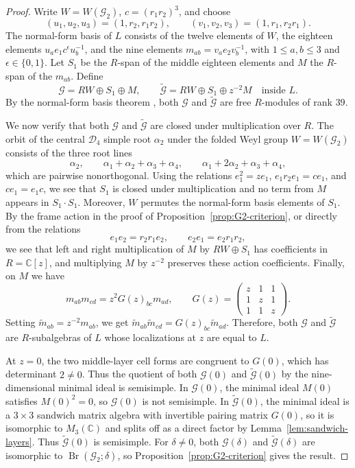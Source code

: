 \documentclass[11pt,a4paper]{amsart}
\theoremstyle{uprightdefinition}
\theoremstyle{remark}\newtheorem{remark}[theorem]{Remark}
\begin{document}
\begin{proof}
Write $W=W(\mathscr{G}_2)$, $c=(r_1r_2)^3$, and choose
\[
 (u_1,u_2,u_3)=(1,r_2,r_1r_2),\qquad
 (v_1,v_2,v_3)=(1,r_1,r_2r_1).
\]
The normal-form basis of $L$ consists of the twelve elements of $W$,
the eighteen elements
$u_a e_1c^\epsilon u_b^{-1}$, and the nine elements
$m_{ab}=v_a e_2v_b^{-1}$, with $1\le a,b\le3$ and
$\epsilon\in\{0,1\}$. Let $S_1$ be the $R$-span of the middle
eighteen elements and $M$ the $R$-span of the $m_{ab}$. Define
\[
 \mathcal G=RW\oplus S_1\oplus M,\qquad
 \widetilde{\mathcal G}=RW\oplus S_1\oplus z^{-2}M
 \quad\text{inside }L.
\]
By the normal-form basis theorem \cite[Theorem~6.1]{LiuG22015}, both $\mathcal G$ and $\widetilde{\mathcal G}$ are free $R$-modules of rank $39$.

We now verify that both $\mathcal G$ and $\widetilde{\mathcal G}$ are closed under multiplication over $R$. The orbit of the central $\mathscr{D}_4$ simple root $\alpha_2$ under the
folded Weyl group $W=W(\mathscr{G}_2)$ consists of the three root lines
\[
 \alpha_2,\qquad
 \alpha_1+\alpha_2+\alpha_3+\alpha_4,\qquad
 \alpha_1+2\alpha_2+\alpha_3+\alpha_4,
\]
which are pairwise nonorthogonal. Using the relations
$e_1^2=ze_1$, $e_1r_2e_1=ce_1$, and $ce_1=e_1c$, we see that $S_1$ is closed under multiplication and no term from $M$ appears in $S_1\cdot S_1$. Moreover, $W$ permutes
the normal-form basis elements of $S_1$. By the frame action in the proof of
Proposition~\ref{prop:G2-criterion}, or directly from the relations
\[
 e_1e_2=r_2r_1e_2,\qquad e_2e_1=e_2r_1r_2,
\]
we see that left and right multiplication of $M$ by $RW\oplus S_1$ has
coefficients in $R=\mathbb C[z]$, and multiplying $M$ by $z^{-2}$ preserves these action coefficients. Finally, on $M$ we have
\[
 m_{ab}m_{cd}=z^2G(z)_{bc}m_{ad},\qquad
 G(z)=\begin{pmatrix}z&1&1\\1&z&1\\1&1&z\end{pmatrix}.
\]
Setting $\widetilde m_{ab}=z^{-2}m_{ab}$, we get
$\widetilde m_{ab}\widetilde m_{cd}=G(z)_{bc}\widetilde m_{ad}$.
Therefore, both $\mathcal G$ and $\widetilde{\mathcal G}$ are $R$-subalgebras of $L$ whose localizations at $z$ are equal to $L$.

At $z=0$, the two middle-layer cell forms are congruent to $G(0)$, which has
determinant $2\ne0$. Thus the quotient of both $\mathcal G(0)$ and $\widetilde{\mathcal G}(0)$ by the nine-dimensional minimal ideal is
semisimple. In $\mathcal G(0)$, the minimal ideal $M(0)$ satisfies $M(0)^2=0$, so $\mathcal G(0)$ is not semisimple. In $\widetilde{\mathcal G}(0)$, the minimal ideal is a $3\times3$ sandwich
matrix algebra with invertible pairing matrix $G(0)$, so it is isomorphic to $M_3(\mathbb C)$ and splits off as a direct factor by Lemma~\ref{lem:sandwich-layers}. Thus $\widetilde{\mathcal G}(0)$ is semisimple.
For $\delta\ne0$, both $\mathcal G(\delta)$ and $\widetilde{\mathcal G}(\delta)$ are isomorphic
to $\operatorname{Br}(\mathscr{G}_2;\delta)$, so Proposition~\ref{prop:G2-criterion} gives the result.
\end{proof}
\end{document}

